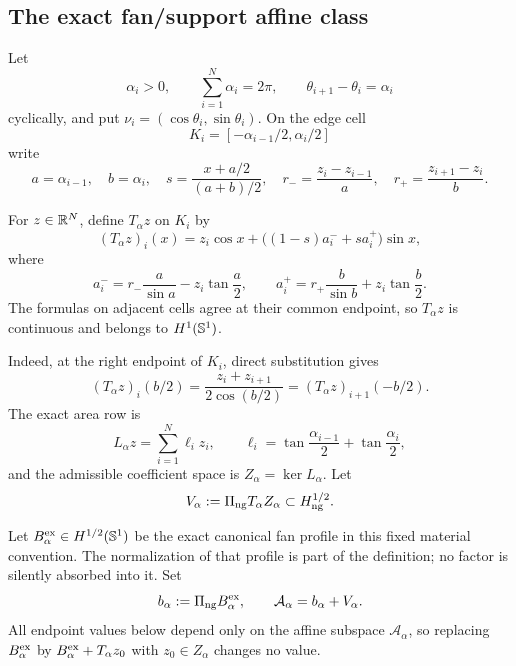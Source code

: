 \subsection{The exact fan/support affine class}

Let
\begin{equation}
 \alpha_i>0,\qquad \sum_{i=1}^N\alpha_i=2\pi,
 \qquad \theta_{i+1}-\theta_i=\alpha_i
\end{equation}
cyclically, and put $\nu_i=(\cos\theta_i,\sin\theta_i)$.  On the edge cell
\begin{equation}
 K_i=[-\alpha_{i-1}/2,\alpha_i/2]
\end{equation}
write
\begin{equation}
 a=\alpha_{i-1},\quad b=\alpha_i,\quad
 s=\frac{x+a/2}{(a+b)/2},\quad
 r_- =\frac{z_i-z_{i-1}}a,\quad
 r_+=\frac{z_{i+1}-z_i}b.
\end{equation}

\begin{definition}\label{F51:def:T}
For $z\in\mathbb R^N$, define $T_\alpha z$ on $K_i$ by
\begin{equation}\label{F51:eq:T}
 (T_\alpha z)_i(x)
 =z_i\cos x+\bigl((1-s)a_i^-+sa_i^+\bigr)\sin x,
\end{equation}
where
\begin{equation}\label{F51:eq:apm}
 a_i^-=r_-\frac a{\sin a}-z_i\tan\frac a2,
 \qquad
 a_i^+=r_+\frac b{\sin b}+z_i\tan\frac b2.
\end{equation}
The formulas on adjacent cells agree at their common endpoint, so
$T_\alpha z$ is continuous and belongs to $H^1(\mathbb S^1)$.
\end{definition}

Indeed, at the right endpoint of $K_i$, direct substitution gives
\begin{equation}
 (T_\alpha z)_i(b/2)
 =\frac{z_i+z_{i+1}}{2\cos(b/2)}
 =(T_\alpha z)_{i+1}(-b/2).
\end{equation}
The exact area row is
\begin{equation}\label{F51:eq:area-row}
 L_\alpha z=\sum_{i=1}^N\ell_i z_i,
 \qquad
 \ell_i=\tan\frac{\alpha_{i-1}}2+\tan\frac{\alpha_i}2,
\end{equation}
and the admissible coefficient space is $Z_\alpha=\ker L_\alpha$.  Let
\begin{equation}\label{F51:eq:V}
 V_\alpha:=\Pi_{\rm ng} T_\alpha Z_\alpha\subset H_{\rm ng}^{1/2}.
\end{equation}

Let $B_\alpha^{\rm ex}\in H^{1/2}(\mathbb S^1)$ be the exact canonical fan
profile in this fixed material convention.  The normalization of that
profile is part of the definition; no factor is silently absorbed into it.
Set
\begin{equation}\label{F51:eq:b}
 b_\alpha:=\Pi_{\rm ng} B_\alpha^{\rm ex},
 \qquad
 \mathcal A_\alpha=b_\alpha+V_\alpha.
\end{equation}
All endpoint values below depend only on the affine subspace
$\mathcal A_\alpha$, so replacing $B_\alpha^{\rm ex}$ by
$B_\alpha^{\rm ex}+T_\alpha z_0$ with $z_0\in Z_\alpha$ changes no value.


